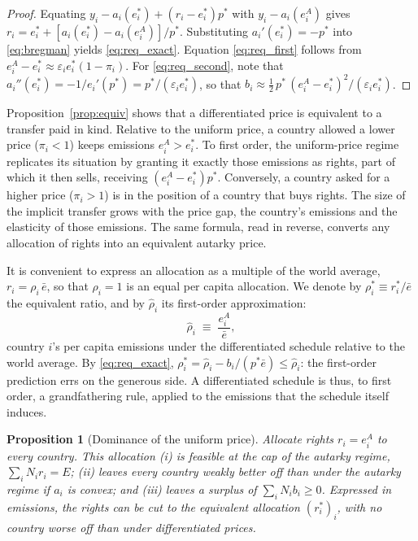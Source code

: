\documentclass[12pt,english]{article}
\newtheorem{proposition}{Proposition}
\theoremstyle{remark}
\begin{document}
\begin{proof}
Equating $y_i-a_i(e^*_i)+(r_i-e^*_i)p^*$ with $y_i-a_i(e^A_i)$ gives $r_i=e^*_i+[a_i(e^*_i)-a_i(e^A_i)]/p^*$. Substituting $a_i'(e^*_i)=-p^*$ into \eqref{eq:bregman} yields \eqref{eq:req_exact}. Equation \eqref{eq:req_first} follows from $e^A_i-e^*_i\approx\varepsilon_i e^*_i(1-\pi_i)$. For \eqref{eq:req_second}, note that $a_i''(e^*_i)=-1/e_i'(p^*)=p^*/(\varepsilon_i e^*_i)$, so that $b_i\approx \tfrac12\,p^*\,(e^A_i-e^*_i)^2/(\varepsilon_i e^*_i)$.
\end{proof}

Proposition~\ref{prop:equiv} shows that a differentiated price is equivalent to a transfer paid in kind. Relative to the uniform price, a country allowed a lower price ($\pi_i<1$) keeps emissions $e^A_i>e^*_i$. To first order, the uniform-price regime replicates its situation by granting it exactly those emissions as rights, part of which it then sells, receiving $(e^A_i-e^*_i)p^*$. Conversely, a country asked for a higher price ($\pi_i>1$) is in the position of a country that buys rights. The size of the implicit transfer grows with the price gap, the country's emissions and the elasticity of those emissions. The same formula, read in reverse, converts any allocation of rights into an equivalent autarky price.

It is convenient to express an allocation as a multiple of the world average, $r_i=\rho_i\,\bar e$, so that $\rho_i=1$ is an equal per capita allocation. We denote by $\rho^*_i\equiv r^*_i/\bar e$ the equivalent ratio, and by $\hat\rho_i$ its first-order approximation:
\begin{equation}
  \hat\rho_i \;\equiv\; \frac{e^A_i}{\bar e},
  \label{eq:rhohat_static}
\end{equation}
country $i$'s per capita emissions under the differentiated schedule relative to the world average. By \eqref{eq:req_exact}, $\rho^*_i=\hat\rho_i-b_i/(p^*\bar e)\le\hat\rho_i$: the first-order prediction errs on the generous side. A differentiated schedule is thus, to first order, a grandfathering rule, applied to the emissions that the schedule itself induces.

\begin{proposition}[Dominance of the uniform price]\label{prop:dominance}
Allocate rights $r_i=e^A_i$ to every country. This allocation (i) is feasible at the cap of the autarky regime, $\sum_i N_i r_i=E$; (ii) leaves every country weakly better off than under the autarky regime
if $a_i$ is convex;
and (iii) leaves a surplus of $\sum_i N_i b_i\geq 0$. Expressed in emissions, the rights can be cut
to the equivalent allocation $(r^*_i)_i$, with no country worse off than under differentiated prices.
\end{proposition}
\end{document}
